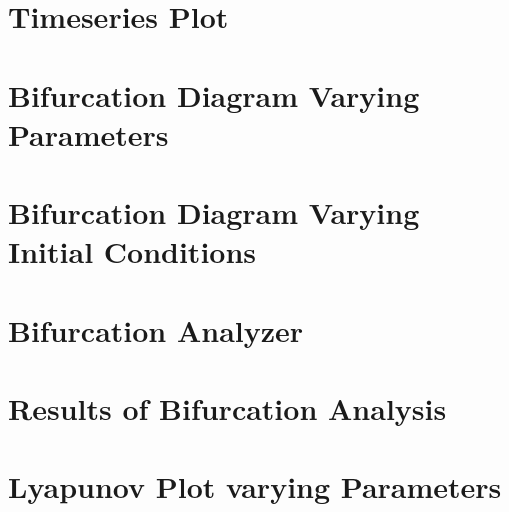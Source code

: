 \section{Timeseries Plot}

\section{Bifurcation Diagram Varying Parameters}

\section{Bifurcation Diagram Varying Initial Conditions}

\section{Bifurcation Analyzer}\label{bifurcation_analyzer}


\section{Results of Bifurcation Analysis}\label{bifurcation_analysis}


\section{Lyapunov Plot varying Parameters}

